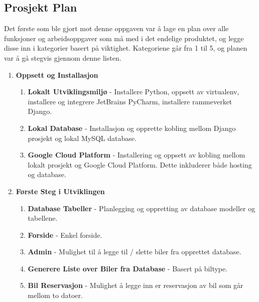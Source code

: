 \subsection{Prosjekt Plan} \label{kravliste2}
Det første som ble gjort mot denne oppgaven var å lage en plan over alle funksjoner og arbeidsoppgaver som må med i det endelige produktet, og legge disse inn i kategorier basert på viktighet. Kategoriene går fra 1 til 5, og planen var å gå stegvis gjennom denne listen. 
 \begin{enumerate}
 
  \item \textbf{Oppsett og Installasjon}
  \begin{enumerate}
  	\item \textbf{Lokalt Utviklingsmiljø} - Installere Python, oppsett av virtualenv, installere og integrere JetBrains PyCharm, installere rammeverket Django.
  	\item \textbf{Lokal Database} - Installasjon og opprette kobling mellom Django prosjekt og lokal MySQL database.
  	\item \textbf{Google Cloud Platform} - Installering og oppsett av kobling mellom lokalt prosjekt og Google Cloud Platform. Dette inkluderer både hosting og database.
  \end{enumerate}
  
  \item \textbf{Første Steg i Utviklingen}
  \begin{enumerate}
  	\item \textbf{Database Tabeller} - Planlegging og oppretting av database modeller og tabellene.
  	\item \textbf{Forside} - Enkel forside.
  	\item \textbf{Admin} - Mulighet til å legge til / slette biler fra opprettet database.
  	\item \textbf{Generere Liste over Biler fra Database} - Basert på biltype.
  	\item \textbf{Bil Reservasjon} - Mulighet å legge inn er reservasjon av bil som går mellom to datoer.
  \end{enumerate}
  

\end{enumerate}
